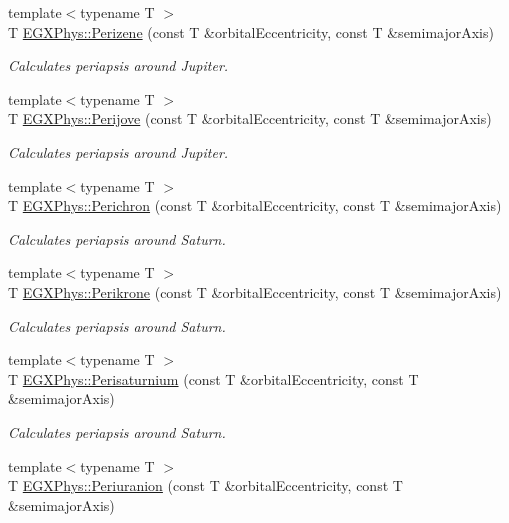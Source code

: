 \begin{DoxyCompactItemize}
{\footnotesize template$<$typename T $>$ }\\T \mbox{\hyperlink{group___periapsis_ga0523c65b7fc26e675388b2c3d38aa00b}{E\+G\+X\+Phys\+::\+Perizene}} (const T \&orbital\+Eccentricity, const T \&semimajor\+Axis)
\begin{DoxyCompactList}\small\item\em Calculates periapsis around Jupiter. \end{DoxyCompactList}\item 
{\footnotesize template$<$typename T $>$ }\\T \mbox{\hyperlink{group___periapsis_ga075052f7ff9aa1d5fdf4501b493be86b}{E\+G\+X\+Phys\+::\+Perijove}} (const T \&orbital\+Eccentricity, const T \&semimajor\+Axis)
\begin{DoxyCompactList}\small\item\em Calculates periapsis around Jupiter. \end{DoxyCompactList}\item 
{\footnotesize template$<$typename T $>$ }\\T \mbox{\hyperlink{group___periapsis_ga12b5e99aa2e3e7031ef6ce93060cf516}{E\+G\+X\+Phys\+::\+Perichron}} (const T \&orbital\+Eccentricity, const T \&semimajor\+Axis)
\begin{DoxyCompactList}\small\item\em Calculates periapsis around Saturn. \end{DoxyCompactList}\item 
{\footnotesize template$<$typename T $>$ }\\T \mbox{\hyperlink{group___periapsis_gaa56f74c44a3583b8f0d13b821c1d7422}{E\+G\+X\+Phys\+::\+Perikrone}} (const T \&orbital\+Eccentricity, const T \&semimajor\+Axis)
\begin{DoxyCompactList}\small\item\em Calculates periapsis around Saturn. \end{DoxyCompactList}\item 
{\footnotesize template$<$typename T $>$ }\\T \mbox{\hyperlink{group___periapsis_ga60a50d09d29ebe47cbbfc125c2ea42bf}{E\+G\+X\+Phys\+::\+Perisaturnium}} (const T \&orbital\+Eccentricity, const T \&semimajor\+Axis)
\begin{DoxyCompactList}\small\item\em Calculates periapsis around Saturn. \end{DoxyCompactList}\item 
{\footnotesize template$<$typename T $>$ }\\T \mbox{\hyperlink{group___periapsis_gab8b8131a617dd2d2a4de1d48accd7442}{E\+G\+X\+Phys\+::\+Periuranion}} (const T \&orbital\+Eccentricity, const T \&semimajor\+Axis)

\end{DoxyCompactItemize}
